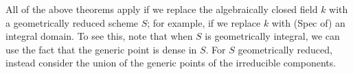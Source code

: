\documentclass{amsart}
\begin{document}
\begin{remark}\label{rmk:replace-with-scheme}
  All of the above theorems apply if we replace the algebraically closed field $k$ with a geometrically reduced scheme $S$; for example, if we replace $k$ with (Spec of) an integral domain. To see this, note that when $S$ is geometrically integral, we can use the fact that the generic point is dense in $S$. For $S$ geometrically reduced, instead consider the union of the generic points of the irreducible components.
\end{remark}














%
\end{document}
